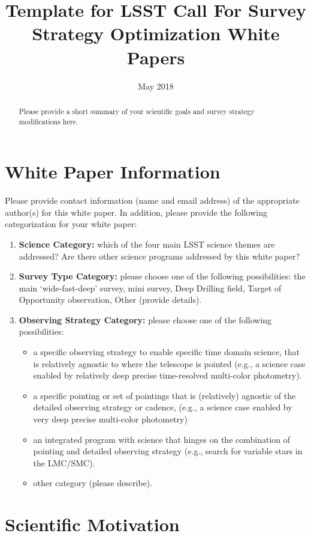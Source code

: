 \documentclass[11pt]{article}
\title{Template for LSST Call For Survey Strategy Optimization White Papers}
\author{}
\date{May 2018}
\begin{document}
\maketitle

\begin{abstract}
Please provide a short summary of your scientific goals and survey strategy modifications here.
\end{abstract}

\section{White Paper Information}
Please provide contact information (name and email address) of the appropriate author(s) for this white paper.
In addition, please provide the following categorization for your white paper:
\begin{enumerate} 
\item {\bf Science Category:} which of the four main LSST science themes are addressed? Are there other
science programs addressed by this white paper?
\item {\bf Survey Type Category:} please choose one of the following possibilities: the main `wide-fast-deep'
   survey, mini survey, Deep Drilling field, Target of Opportunity observation, Other (provide details). 
\item {\bf Observing Strategy Category:} please choose one of the following possibilities: 
    \begin{itemize} 
     \item a specific observing strategy to enable specific time domain science, 
	that is relatively agnostic to where the telescope is pointed (e.g., a science case enabled 
	by relatively deep precise time-resolved multi-color photometry). 
     \item a specific pointing or set of pointings that is (relatively) agnostic of the detailed observing 
	strategy or cadence, (e.g., a science case enabled by very deep precise multi-color 
	photometry)
      \item an integrated program with science that hinges on the combination of pointing and detailed 
	observing strategy (e.g., search for variable stars in the 
	LMC/SMC). 
       \item other category (please describe).
    \end{itemize}  
\end{enumerate}  


\clearpage

\section{Scientific Motivation}
\end{document}
